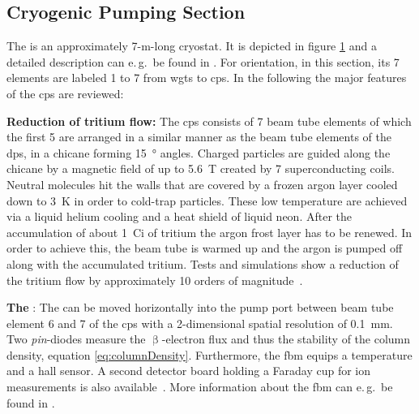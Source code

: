 \subsection{Cryogenic Pumping Section}
\label{sec:katrinExpSetupCryoPumpingSection}
\begin{figure}[t]
 \label{fig:katrinExpSetupCryoPumpingSection}
\end{figure}
The  is an approximately 7-m-long cryostat. It is depicted in figure \ref{fig:katrinExpSetupCryoPumpingSection} and a detailed description can e.\,g.~be found in \cite{Jansen2015}. For orientation, in this section, its 7 elements are labeled 1 to 7 from \gls{wgts} to \gls{cps}. In the following the major features of the \gls{cps} are reviewed:

{\par\textbf{Reduction of tritium flow:}
The \gls{cps} consists of 7 beam tube elements of which the first 5 are arranged in a similar manner as the beam tube elements of the \gls{dps}, in a chicane forming \SI{15}{\degree} angles. Charged particles are guided along the chicane by a magnetic field of up to \SI{5.6}{T} created by 7 superconducting coils. Neutral molecules hit the walls that are covered by a frozen argon layer cooled down to \SI{3}{K} in order to cold-trap particles. These low temperature are achieved via a liquid helium cooling and a heat shield of liquid neon. After the accumulation of about \SI{1}{Ci} of tritium the argon frost layer has to be renewed. In order to achieve this, the beam tube is warmed up and the argon is pumped off along with the accumulated tritium. Tests and simulations show a reduction of the tritium flow by approximately 10 orders of magnitude~\cite{Jansen2015}.}

{\par\textbf{The }: 
The  can be moved horizontally into the pump port between beam tube element 6 and 7 of the \gls{cps} with a 2-dimensional spatial resolution of \SI{0.1}{mm}. Two \textit{pin}-diodes measure the $\upbeta$-electron flux and thus the stability of the column density, equation \eqref{eq:columnDensity}. Furthermore, the \gls{fbm} equips a temperature and a hall sensor. A second detector board holding a Faraday cup for ion measurements is also available~\cite{Klein2019}. More information about the \gls{fbm} can e.\,g.~be found in \cite{Ellinger2017}.}

